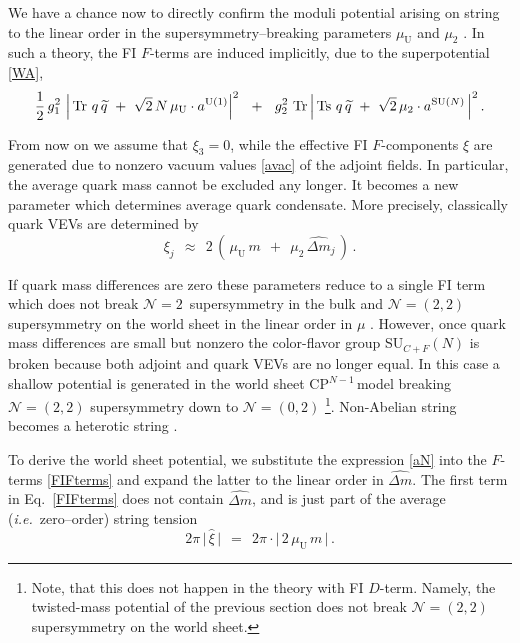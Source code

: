 \documentclass[12pt]{article}
\def\beq{\begin{equation}}
\def\eeq{\end{equation}}
\newcommand{\ntwon}{${\mathcal N}=2$}
\newcommand{\ntwot}{${\mathcal N}= \left(2,2\right) $ }
\newcommand{\ntwoo}{${\mathcal N}= \left(0,2\right) $ }
\newcommand{\wt}{\widetilde}
\newcommand{\aU}{a^{\rm U(1)}}
\newcommand{\aN}{a^\text{SU($N$)}}
\newcommand{\muU}{\mu_\text{U}}
\newcommand{\cpn}{CP$^{N-1}$\,}
\newcommand{\qt}{\wt{q}}
\newcommand{\Tr}{\text{Tr}}
\newcommand{\Ts}{\text{Ts}}
\newcommand{\dm}{\hat{{\scriptstyle \Delta} m}}
\newcommand{\ie}{{\it i.e.}~}
\begin{document}
	We have a chance now to directly confirm the moduli potential arising on string to the linear order
	in the supersymmetry--breaking parameters $ \muU $ and $ \mu_2 $ \cite{Shifman:2010kr}.
	In such a theory, the FI $ F $-terms are induced implicitly, due to the superpotential \eqref{WA},
\beq
\label{FIFterms}
	\frac{1}{2}\,g_1^2~ \Big|\, \Tr~ q\, \qt ~+~ \sqrt{2}\, N\, \muU \cdot \aU \Big|^2
	~~+~~
	g_2^2~ \Tr\, \Big|\, \Ts~ q\, \qt ~+~ \sqrt{2}\, \mu_2 \cdot \aN \,\Big|^2\,.
\eeq

	From now on we assume that $\xi_3=0$, while the effective FI $F$-components  $\xi$ are generated due to nonzero
	vacuum values \eqref{avac} of the adjoint fields. 
	In particular, the average quark mass cannot be excluded any longer. 
	It becomes a new parameter which determines average quark condensate. More precisely, classically quark VEVs are determined by
\beq
\label{xij}
	\xi_j    ~~\approx~~    2\, \left(\, \muU\,m  ~~+~~  \mu_2\,\dm{}_j \,\right)\,.
\eeq

	If quark mass differences are zero these parameters reduce to a single FI term 
	which does not break \ntwon\, supersymmetry in the bulk and 
	\ntwot supersymmetry on the world sheet in the linear order in $\mu$ \cite{HSZ,VY}. 
	However, once quark mass differences are small but nonzero the color-flavor group SU$_{C+F}(N)$ is broken 
	because both  adjoint and quark VEVs are no longer equal. 
	In this case a shallow potential is generated in the world sheet \cpn model
	breaking \ntwot supersymmetry down to \ntwoo \cite{Shifman:2010kr}\footnote{Note, that this does not happen 
	in the theory with FI $D$-term. 
	Namely, the twisted-mass potential of the previous section 
	does not break \ntwot supersymmetry on the world sheet.}. 
	Non-Abelian string becomes a heterotic string \cite{Edalati,SY1}.

	To derive the world sheet potential, we substitute the expression \eqref{aN} into the $ F $-terms
	\eqref{FIFterms} and expand the latter to the linear order in $ \dm $.
	The first term in Eq.~\eqref{FIFterms} does not contain $ \dm $, 
	and is just part of the average (\ie zero--order) string tension
\beq
\label{avtension}
	2 \pi\, \big|\, \hat{\xi} \,\big|    ~~=~~    2 \pi \cdot \Big|\, 2\, \muU\, m \,\Big| \,.
\eeq
	
\end{document}
